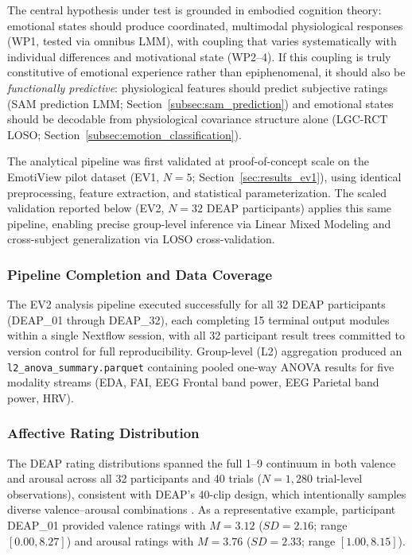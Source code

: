 The central hypothesis under test is grounded in embodied cognition theory: emotional states should produce coordinated, multimodal physiological responses (WP1, tested via omnibus LMM), with coupling that varies systematically with individual differences and motivational state (WP2--4). If this coupling is truly constitutive of emotional experience rather than epiphenomenal, it should also be \emph{functionally predictive}: physiological features should predict subjective ratings (SAM prediction LMM; Section~\ref{subsec:sam_prediction}) and emotional states should be decodable from physiological covariance structure alone (LGC-RCT LOSO; Section~\ref{subsec:emotion_classification}).

The analytical pipeline was first validated at proof-of-concept scale on the EmotiView pilot dataset (EV1, $N=5$; Section~\ref{sec:results_ev1}), using identical preprocessing, feature extraction, and statistical parameterization. The scaled validation reported below (EV2, $N=32$ DEAP participants) applies this same pipeline, enabling precise group-level inference via Linear Mixed Modeling and cross-subject generalization via LOSO cross-validation.

\subsubsection{Pipeline Completion and Data Coverage}

The EV2 analysis pipeline executed successfully for all 32 DEAP participants (DEAP\_01 through DEAP\_32), each completing 15 terminal output modules within a single Nextflow session, with all 32 participant result trees committed to version control for full reproducibility. Group-level (L2) aggregation produced an \texttt{l2\_anova\_summary.parquet} containing pooled one-way \gls{ANOVA} results for five modality streams (EDA, \gls{FAI}, EEG Frontal band power, EEG Parietal band power, \gls{HRV}).

\subsubsection{Affective Rating Distribution}

The DEAP rating distributions spanned the full 1--9 continuum in both valence and arousal across all 32 participants and 40 trials ($N = 1{,}280$ trial-level observations), consistent with DEAP's 40-clip design, which intentionally samples diverse valence--arousal combinations \parencite{koelstraDeapDatabaseEmotion2012}. As a representative example, participant DEAP\_01 provided valence ratings with $M = 3.12$ ($SD = 2.16$; range $[0.00, 8.27]$) and arousal ratings with $M = 3.76$ ($SD = 2.33$; range $[1.00, 8.15]$).

